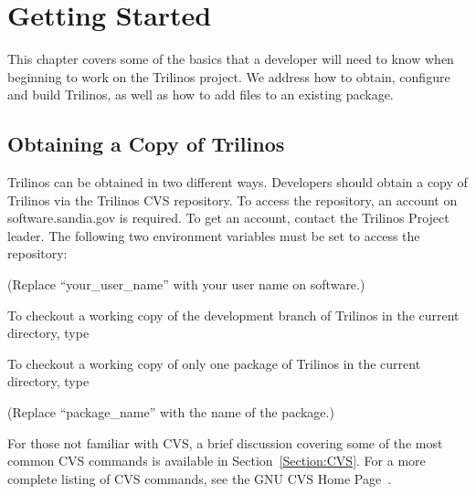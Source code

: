 \documentclass[12pt,relax]{TrilinosDevGuide}
\begin{document}
\section{Getting Started}
\label{Section:GettingStarted}

This chapter covers some of the basics that a developer will need to know when 
beginning to work on the Trilinos project.  We address how to obtain, 
configure and build Trilinos, as well as how to add files to an 
existing package.


\subsection{Obtaining a Copy of Trilinos}

Trilinos can be obtained in two different ways.  Developers should obtain a 
copy of Trilinos via the Trilinos CVS repository.  
To access the repository, an account on software.sandia.gov is required.  
To get an account, contact the Trilinos Project leader.  The following two 
environment variables must be set to access the repository:


(Replace ``your\_user\_name'' with your user name on software.)

To checkout a working copy of the development branch of Trilinos in the 
current directory, type


To checkout a working copy of only one package of Trilinos in the 
current directory, type


(Replace ``package\_name'' with the name of the package.)

For those not familiar with CVS, a brief discussion covering some of the most 
common CVS commands is available in Section~\ref{Section:CVS}.  For a more 
complete listing of CVS commands, see the GNU CVS Home Page~\cite{CVS}.
\end{document}
